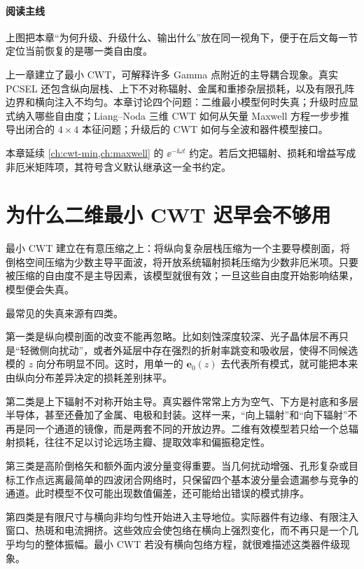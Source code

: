 \paragraph{阅读主线}

上图把本章“为何升级、升级什么、输出什么”放在同一视角下，便于在后文每一节定位当前恢复的是哪一类自由度。

上一章建立了最小 CWT，可解释许多 Gamma 点附近的主导耦合现象。真实 PCSEL 还包含纵向层栈、上下不对称辐射、金属和重掺杂层损耗，以及有限孔阵边界和横向注入不均匀。本章讨论四个问题：二维最小模型何时失真；升级时应显式纳入哪些自由度；Liang--Noda 三维 CWT 如何从矢量 Maxwell 方程一步步推导出闭合的 $4\times4$ 本征问题；升级后的 CWT 如何与全波和器件模型接口。

本章延续 \cref{ch:cwt-min,ch:maxwell} 的 $\ee^{-\ii\omega t}$ 约定。若后文把辐射、损耗和增益写成非厄米矩阵项，其符号含义默认继承这一全书约定。

\section{为什么二维最小 CWT 迟早会不够用}
最小 CWT 建立在有意压缩之上：将纵向复杂层栈压缩为一个主要导模剖面，将倒格空间压缩为少数主导平面波，将开放系统辐射损耗压缩为少数非厄米项。只要被压缩的自由度不是主导因素，该模型就很有效；一旦这些自由度开始影响结果，模型便会失真。

最常见的失真来源有四类。

第一类是纵向模剖面的改变不能再忽略。比如刻蚀深度较深、光子晶体层不再只是“轻微侧向扰动”，或者外延层中存在强烈的折射率跳变和吸收层，使得不同候选模的 $z$ 向分布明显不同。这时，用单一的 $\bm{e}_0(z)$ 去代表所有模式，就可能把本来由纵向分布差异决定的损耗差别抹平。

第二类是上下辐射不对称开始主导。真实器件常常上方为空气、下方是衬底和多层半导体，甚至还叠加了金属、电极和封装。这样一来，“向上辐射”和“向下辐射”不再是同一个通道的镜像，而是两套不同的开放边界。二维有效模型若只给一个总辐射损耗，往往不足以讨论远场主瓣、提取效率和偏振稳定性。

第三类是高阶倒格矢和额外面内波分量变得重要。当几何扰动增强、孔形复杂或目标工作点远离最简单的四波闭合网络时，只保留四个基本波分量会遗漏参与竞争的通道。此时模型不仅可能出现数值偏差，还可能给出错误的模式排序。

第四类是有限尺寸与横向非均匀性开始进入主导地位。实际器件有边缘、有限注入窗口、热斑和电流拥挤。这些效应会使包络在横向上强烈变化，而不再只是一个几乎均匀的整体振幅。最小 CWT 若没有横向包络方程，就很难描述这类器件级现象。

